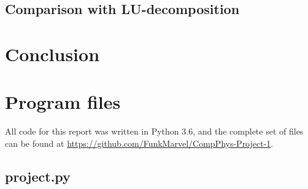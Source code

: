 \documentclass[english,notitlepage]{revtex4-1}  %
\begin{document}
\subsection{Comparison with LU-decomposition}\label{subsec:43}

\section{Conclusion}\label{sec:5}

\appendix
\section{Program files} \label{A}
All code for this report was written in Python 3.6, and the complete set of files can be found at \url{https://github.com/FunkMarvel/CompPhys-Project-1}.
\subsection{project.py}\label{A:1}
\end{document}
